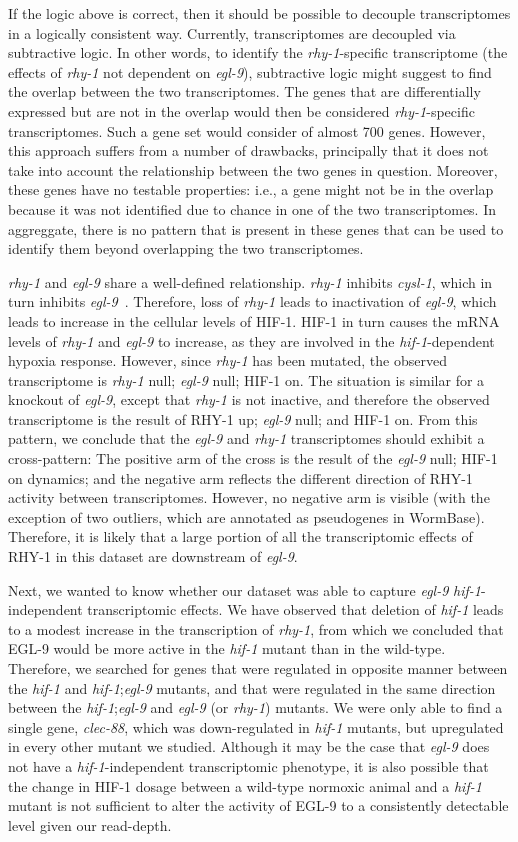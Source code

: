 \documentclass[9pt,twocolumn,twoside]{pnas-new}
\newcommand{\egl}{\emph{egl-9}}
\newcommand{\cysl}{\emph{cysl-1}}
\newcommand{\rhy}{\emph{rhy-1}}
\newcommand{\hif}{\emph{hif-1}}
\newcommand{\eglp}{EGL-9}
\newcommand{\rhyp}{RHY-1}
\newcommand{\hifp}{HIF-1}
\begin{document}
If the logic above is correct, then it should be possible to decouple
transcriptomes in a logically consistent way. Currently, transcriptomes are
decoupled via subtractive logic. In other words, to identify the \rhy{}-specific
transcriptome (the effects of \rhy{} not dependent on \egl{}), subtractive logic
might suggest to find the overlap between the two transcriptomes. The genes that
are differentially expressed but are not in the overlap would then be considered
\rhy{}-specific transcriptomes. Such a gene set would consider of almost 700 genes.
However, this approach suffers from a number of
drawbacks, principally that it does not take into account the relationship
between the two genes in question. Moreover, these genes have no testable properties:
i.e., a gene might not be in the overlap because it was not identified due to
chance in one of the two transcriptomes. In aggreggate, there is no pattern that
is present in these genes that can be used to identify them beyond overlapping
the two transcriptomes.

\rhy{} and \egl{} share a well-defined relationship. \rhy{} inhibits \cysl{},
which in turn inhibits \egl{}~\cite{Ma2012}. Therefore, loss of \rhy{} leads
to inactivation of \egl{}, which leads to increase in the cellular levels of
\hifp{}. \hifp{} in turn causes the mRNA levels of \rhy{} and \egl{} to increase,
as they are involved in the \hif{}-dependent hypoxia response. However, since
\rhy{} has been mutated, the observed transcriptome is \rhy{} null; \egl{} null;
\hifp{} on. The situation is similar for a knockout of \egl{}, except that \rhy{}
is not inactive, and therefore the observed transcriptome is the result of
\rhyp{} up; \egl{} null; and \hifp{} on. From this pattern, we conclude that
the \egl{} and \rhy{} transcriptomes should exhibit a cross-pattern: The positive
arm of the cross is the result of the \egl{} null; \hifp{} on dynamics; and the
negative arm reflects the different direction of \rhyp{} activity between
transcriptomes. However, no negative arm is visible (with the exception of two
outliers, which are annotated as pseudogenes in WormBase). Therefore, it is likely
that a large portion of all the transcriptomic effects of \rhyp{} in this dataset
are downstream of \egl{}.

Next, we wanted to know whether our dataset was able to capture \egl{}
\hif{}-independent transcriptomic effects. We have observed that deletion of
\hif{} leads to a modest increase in the transcription of \rhy{}, from which we
concluded that \eglp{} would be more active in the \hif{} mutant than in the
wild-type. Therefore, we searched for genes that were regulated in opposite
manner between the \hif{} and \hif{};\egl{} mutants, and that were regulated
in the same direction between the \hif{};\egl{} and \egl{} (or \rhy{}) mutants.
We were only able to find a single gene, \emph{clec-88}, which was down-regulated
in \hif{} mutants, but upregulated in every other mutant we studied. Although
it may be the case that \egl{} does not have a \hif{}-independent transcriptomic
phenotype, it is also possible that the change in \hifp{} dosage between a
wild-type normoxic animal and a \hif{} mutant is not sufficient to alter the
activity of \eglp{} to a consistently detectable level given our read-depth.
\end{document}
